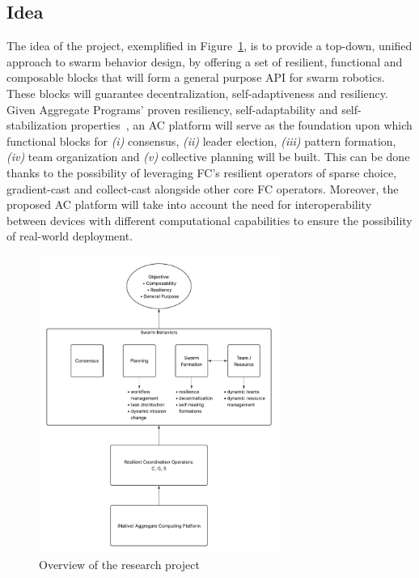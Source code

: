 \documentclass[12pt]{article}
\begin{document}
\subsection{Idea}
The idea of the project, exemplified in Figure~\ref{fig:research-project}, is to provide a top-down, unified approach to swarm behavior design, by offering a
set of resilient, functional and composable blocks that will form a general purpose API for swarm robotics. These blocks will guarantee decentralization, self-adaptiveness and resiliency.
Given Aggregate Programs' proven resiliency, self-adaptability and self-stabilization properties~\cite{viroli2018engineering}, an AC platform will serve as the
foundation upon which functional blocks for \textit{(i)} consensus, \textit{(ii)} leader election, \textit{(iii)} pattern formation,
\textit{(iv)} team organization and \textit{(v)} collective planning will be built. This can be done thanks to the possibility of leveraging FC's resilient operators of sparse choice, 
gradient-cast and collect-cast alongside other core FC operators. Moreover, the proposed AC platform will take into account the need for interoperability between devices with different 
computational capabilities to ensure the possibility of real-world deployment.

\begin{figure}
	\centering
	\includegraphics[width=0.7\textwidth]{figures/ResearchProject.png}
	\caption{Overview of the research project}
	 \label{fig:research-project}
\end{figure}
\end{document}
